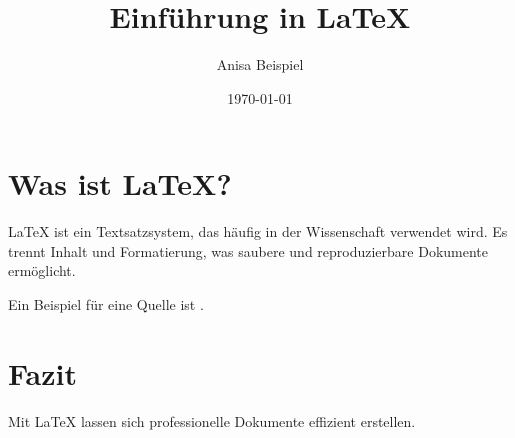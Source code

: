 \documentclass[a4paper,12pt]{article}
\title{Einführung in \LaTeX}
\author{Anisa Beispiel}
\date{\today}
\begin{document}
\maketitle

\tableofcontents
\newpage

\section{Was ist \LaTeX?}
\LaTeX{} ist ein Textsatzsystem, das häufig in der Wissenschaft verwendet wird.
Es trennt Inhalt und Formatierung, was saubere und reproduzierbare Dokumente ermöglicht.

Ein Beispiel für eine Quelle ist \cite{DemoQuelle}.

\section{Fazit}
Mit \LaTeX{} lassen sich professionelle Dokumente effizient erstellen.

\newpage
\printbibliography
\end{document}
